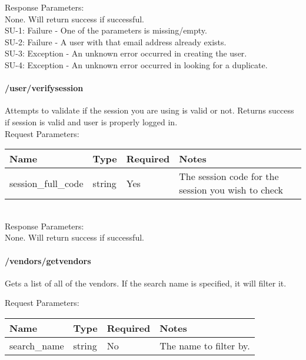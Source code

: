 \documentclass{article}[11pt]
\begin{document}
\noindent
Response Parameters: \\
None. Will return success if successful. \\

\ErrorsMysql
SU-1: Failure - One of the parameters is missing/empty. \\
SU-2: Failure - A user with that email address already exists. \\
SU-3: Exception - An unknown error occurred in creating the user. \\
SU-4: Exception - An unknown error occurred in looking for a duplicate.


\paragraph{/user/verifysession}\textbf{}

Attempts to validate if the session you are using is valid or not. Returns success if session is valid and user is properly logged in. \\

\noindent
Request Parameters:

\noindent
\begin{tabular}{|l|l|l|l|}
\hline
\textbf{Name} & \textbf{Type} & \textbf{Required} & \textbf{Notes} \\
\hline
session\_full\_code & string & Yes & The session code for the session you wish to check \\
\hline
\end{tabular} \\

\noindent
Response Parameters: \\
None. Will return success if successful. \\

\ErrorsSession



\paragraph{/vendors/getvendors}\textbf{}

Gets a list of all of the vendors. If the search name is specified, it will filter it.

\noindent
Request Parameters:

\noindent
\begin{tabular}{|l|l|l|l|}
\hline
\textbf{Name} & \textbf{Type} & \textbf{Required} & \textbf{Notes} \\
\hline
search\_name & string & No & The name to filter by. \\
\hline
\end{tabular} \\
\end{document}
